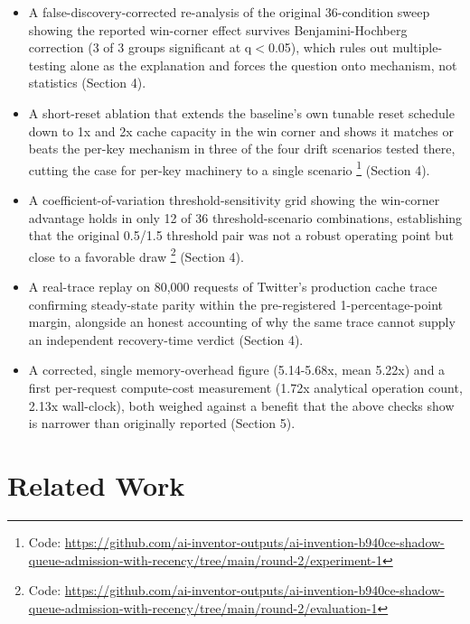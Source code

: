 \documentclass[11pt,letterpaper]{article}
\begin{document}
\begin{itemize}
\item A false-discovery-corrected re-analysis of the original 36-condition sweep showing the reported win-corner effect survives Benjamini-Hochberg correction (3 of 3 groups significant at q$<$0.05), which rules out multiple-testing alone as the explanation and forces the question onto mechanism, not statistics (Section 4).
\item A short-reset ablation that extends the baseline's own tunable reset schedule down to 1x and 2x cache capacity in the win corner and shows it matches or beats the per-key mechanism in three of the four drift scenarios tested there, cutting the case for per-key machinery to a single scenario \footnote{Code: \url{https://github.com/ai-inventor-outputs/ai-invention-b940ce-shadow-queue-admission-with-recency/tree/main/round-2/experiment-1}} (Section 4).
\item A coefficient-of-variation threshold-sensitivity grid showing the win-corner advantage holds in only 12 of 36 threshold-scenario combinations, establishing that the original 0.5/1.5 threshold pair was not a robust operating point but close to a favorable draw \footnote{Code: \url{https://github.com/ai-inventor-outputs/ai-invention-b940ce-shadow-queue-admission-with-recency/tree/main/round-2/evaluation-1}} (Section 4).
\item A real-trace replay on 80,000 requests of Twitter's production cache trace confirming steady-state parity within the pre-registered 1-percentage-point margin, alongside an honest accounting of why the same trace cannot supply an independent recovery-time verdict (Section 4).
\item A corrected, single memory-overhead figure (5.14-5.68x, mean 5.22x) and a first per-request compute-cost measurement (1.72x analytical operation count, 2.13x wall-clock), both weighed against a benefit that the above checks show is narrower than originally reported (Section 5).
\end{itemize}

\section{Related Work}
\end{document}
